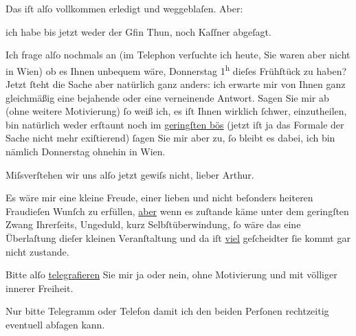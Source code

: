 \pstart
           Das iſt alſo vollkommen erledigt und weggeblaſen. {\pb}Aber:\pend
           
\pstart
           ich habe bis jetzt weder der Gfin Thun, noch
                  Kaſſner abgeſagt.\pend
           
\pstart
           Ich frage alſo nochmals an (im Telephon verſuchte ich heute, Sie waren aber nicht in
                  Wien) ob es Ihnen unbequem wäre,
                  Donnerstag{ }1\textsuperscript{h} dieſes Frühſtück zu haben? Jetzt{ }ſteht die Sache aber
                  {\pb}natürlich ganz anders: ich
               erwarte mir von Ihnen ganz gleichmäßig eine bejahende oder eine verneinende Antwort.
               Sagen Sie mir ab (ohne weitere Motivierung){ }ſo weiß ich, es iſt Ihnen wirklich{ }ſchwer, einzutheilen, bin natürlich weder erſtaunt noch im \uline{geringſten bös} (jetzt iſt ja das Formale der Sache nicht mehr exiſtierend)
                  {\pb}ſagen Sie mir aber zu,{ }ſo
               bleibt es dabei, ich bin nämlich Donnerstag ohnehin in Wien.\pend
           
\pstart
           Miſsverſtehen wir uns alſo jetzt gewiſs nicht, lieber Arthur.\pend
           
\pstart
           Es wäre mir eine kleine Freude, einer lieben und nicht beſonders heiteren Fraudieſen Wunſch zu erfüllen, \uline{aber} wenn es zuſtande käme unter dem geringſten Zwang
               Ihrerſeits, Ungeduld, kurz Selbſtüberwindung,{ }ſo wäre das eine Überlaſtung dieſer
               kleinen Veranſtaltung und da iſt \uline{viel} geſcheidter {\pb}ſie kommt gar nicht zustande.\pend
           
\pstart
           Bitte alſo \uline{telegrafieren} Sie mir ja oder nein, ohne
               Motivierung und mit völliger innerer Freiheit.\pend
           
\pstart
           Nur bitte Telegramm oder Telefon damit ich den beiden Perſonen rechtzeitig eventuell {\pb}abſagen kann.\pend
           
